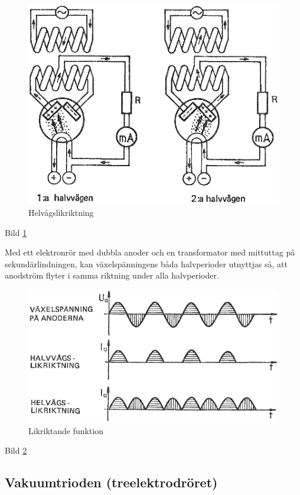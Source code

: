 \begin{figure}
\includegraphics[width=\textwidth]{images/bild_2_2-28.png}
\caption{Helvågslikriktning}
\label{fig:BildII2-28}
\end{figure}

Bild \ref{fig:BildII2-28}

Med ett elektronrör med dubbla anoder och en transformator med mittuttag på
sekundärlindningen, kan växelspänningens båda halvperioder utnyttjas så, att
anodström flyter i samma riktning under alla halvperioder.

\begin{figure}
\includegraphics[width=\textwidth]{images/bild_2_2-29.png}
\caption{Likriktande funktion}
\label{fig:BildII2-29}
\end{figure}

Bild \ref{fig:BildII2-29}

\subsection{Vakuumtrioden (treelektrodröret)}

